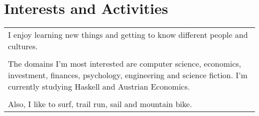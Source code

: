\documentclass[a4paper,10pt]{article} %
\begin{document}
 


\section{Interests and Activities}
\begin{tabular}{p{13.7cm}}
\hspace{2em} I enjoy learning new things and getting to know different
people and cultures. \\ \\

\hspace{2em} The domains I'm most interested are computer science,
economics, investment, finances, psychology, engineering and science
fiction. I'm currently studying Haskell and Austrian Economics.\\ \\

\hspace{2em} Also, I like to surf, trail run, sail and mountain bike.

\end{tabular}
\end{document}
